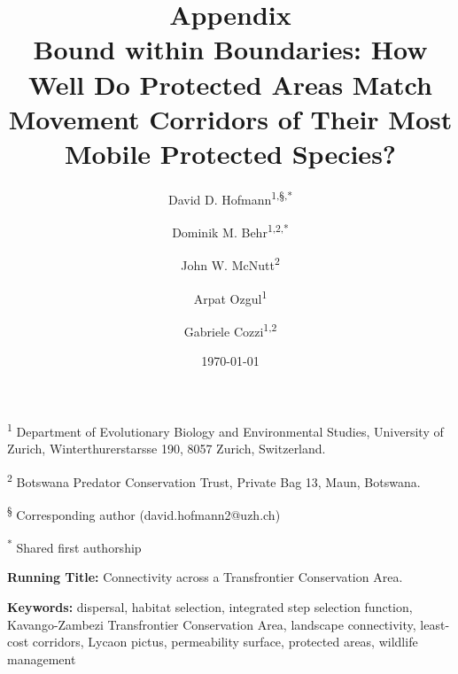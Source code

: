 \documentclass[abstract=off,10pt,a4paper,bibliography=totocnumbered]{article}
\title{\textbf{Appendix}\\ Bound within Boundaries: How Well Do Protected Areas
Match Movement Corridors of Their Most Mobile Protected Species?}
\author{
  David D. Hofmann\textsuperscript{1,\S,*} \and
  Dominik M. Behr\textsuperscript{1,2,*} \and
  John W. McNutt\textsuperscript{2} \and
  Arpat Ozgul\textsuperscript{1} \and
  Gabriele Cozzi\textsuperscript{1,2}
}
\date{\today}
\newcommand{\beginappendix}{%
  \setcounter{table}{0}
  \renewcommand{\thetable}{S\arabic{table}}%
  \setcounter{figure}{0}
  \renewcommand{\thefigure}{S\arabic{figure}}%
  \setcounter{equation}{0}
  \renewcommand{\theequation}{Equation S\arabic{equation}}%
  \setcounter{section}{0}
  \renewcommand{\thesection}{A.\arabic{section}}%
}
\begin{document}



\maketitle

\begin{flushleft}

\vspace{0.5cm}

\textsuperscript{1} Department of Evolutionary Biology and Environmental
Studies, University of Zurich, Winterthurerstarsse 190, 8057 Zurich,
Switzerland.

\textsuperscript{2} Botswana Predator Conservation Trust, Private Bag 13, Maun,
Botswana.

\textsuperscript{\S} Corresponding author (david.hofmann2@uzh.ch)

\textsuperscript{*} Shared first authorship

\vspace{4cm}

\textbf{Running Title:} Connectivity across a Transfrontier Conservation Area.

\vspace{0.5cm}

\textbf{Keywords:} dispersal, habitat selection, integrated step selection
function, Kavango-Zambezi Transfrontier Conservation Area, landscape
connectivity, least-cost corridors, Lycaon pictus, permeability surface,
protected areas, wildlife management

\end{flushleft}

\newpage


\linenumbers

\appendix
\beginappendix

\end{document}
